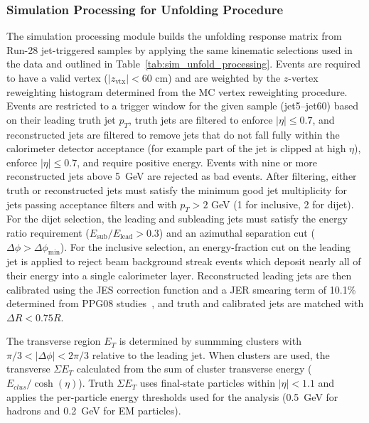 \subsubsection{Simulation Processing for Unfolding Procedure}
The simulation processing module builds the unfolding response matrix from Run-28 jet-triggered samples by applying the same kinematic selections used in the data and outlined in Table~\ref{tab:sim_unfold_processing}. 
Events are required to have a valid vertex ($|z_{\mathrm{vtx}}|<60$ cm) and are weighted by the $z$-vertex reweighting histogram determined from the MC vertex reweighting procedure. 
Events are restricted to a trigger window for the given sample (jet5--jet60) based on their leading truth jet $p_{T}$, truth jets are filtered to enforce $|\eta| \le 0.7$, and reconstructed jets are filtered to remove jets that do not fall fully within the calorimeter detector acceptance (for example part of the jet is clipped at high $\eta$), enforce $|\eta| \le 0.7$, and require positive energy. 
Events with nine or more reconstructed jets above 5~GeV are rejected as bad events.
After filtering, either truth or reconstructed jets must satisfy the minimum good jet multiplicity for jets passing acceptance filters and with $p_{T}> 2$ GeV (1 for inclusive, 2 for dijet). 
For the dijet selection, the leading and subleading jets must satisfy the energy ratio requirement ($E_{\mathrm{sub}}/E_{\mathrm{lead}}>0.3$) and an azimuthal separation cut ($\Delta\phi>\Delta\phi_{\mathrm{min}}$). 
For the inclusive selection, an energy-fraction cut on the leading jet is applied to reject beam background streak events which deposit nearly all of their energy into a single calorimeter layer. 
Reconstructed leading jets are then calibrated using the JES correction function and a JER smearing term of 10.1\% determined from PPG08 studies~\cite{ppg08AN}, and truth and calibrated jets are matched with $\Delta R < 0.75R$. 

The transverse region $E_{T}$ is determined by summming clusters with $\pi/3 < |\Delta\phi| < 2\pi/3$ relative to the leading jet. 
When clusters are used, the transverse $\Sigma E_{T}$ calculated from the sum of cluster transverse energy ($E_{clus}/\cosh(\eta)$). 
Truth $\Sigma E_{T}$ uses final-state particles within $|\eta|<1.1$ and applies the per-particle energy thresholds used for the analysis (0.5~GeV for hadrons and 0.2~GeV for EM particles).

